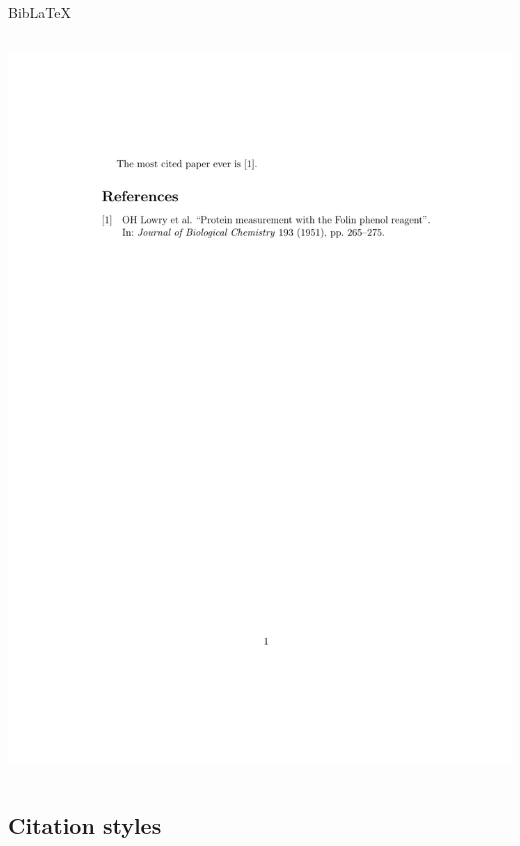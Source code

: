 \documentclass[,aspectratio=43]{beamer}
\begin{document}
\begin{frame}[fragile]{Bib\LaTeX}
\begin{columns}[T]
\begin{column}{0.43\textwidth}
\begin{center}\includegraphics[width=1\linewidth]{figure/biblatex1} \end{center}
\end{column}
\end{columns}
\end{frame}

\hypertarget{citation-styles}{%
\subsection{Citation styles}\label{citation-styles}}
\end{document}
